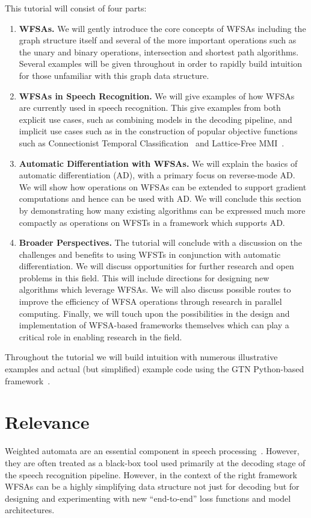 \documentclass[11pt]{article}
\begin{document}
This tutorial will consist of four parts:
\begin{enumerate}
  \item {\bf WFSAs.} We will gently introduce the core concepts of
    WFSAs including the graph structure itself and several of the more
    important operations such as the unary and binary operations, intersection
    and shortest path algorithms. Several examples will be given throughout in
    order to rapidly build intuition for those unfamiliar with this graph data structure.
  \item {\bf WFSAs in Speech Recognition.} We will give examples of how WFSAs
    are currently used in speech recognition. This give examples from both
    explicit use cases, such as combining models in the decoding pipeline, and
    implicit use cases such as in the construction of popular objective
    functions such as Connectionist Temporal Classification~\cite{graves2006}
    and Lattice-Free MMI~\cite{povey2016purely}.
  \item {\bf Automatic Differentiation with WFSAs.} We will explain the basics
    of automatic differentiation (AD), with a primary focus on reverse-mode AD.
    We will show how operations on WFSAs can be extended to support gradient
    computations and hence can be used with AD. We will conclude this section
    by demonstrating how many existing algorithms can be expressed much more
    compactly as operations on WFSTs in a framework which supports AD.
  \item {\bf Broader Perspectives.} The tutorial will conclude with a
    discussion on the challenges and benefits to using WFSTs in conjunction
    with automatic differentiation. We will discuss opportunities for further
    research and open problems in this field. This will include directions for
    designing new algorithms which leverage WFSAs. We will also discuss
    possible routes to improve the efficiency of WFSA operations through
    research in parallel computing. Finally, we will touch upon the
    possibilities in the design and implementation of WFSA-based frameworks
    themselves which can play a critical role in enabling research in the field.
\end{enumerate}

Throughout the tutorial we will build intuition with numerous illustrative
examples and actual (but simplified) example code using the GTN Python-based
framework~\cite{gtn}.

\section*{Relevance}
Weighted automata are an essential component in speech
processing~\cite{mohri2002}. However, they are often treated as a black-box
tool used primarily at the decoding stage of the speech recognition pipeline.
However, in the context of the right framework WFSAs can be a highly
simplifying data structure not just for decoding but for designing and
experimenting with new ``end-to-end'' loss functions and model architectures.
\end{document}
